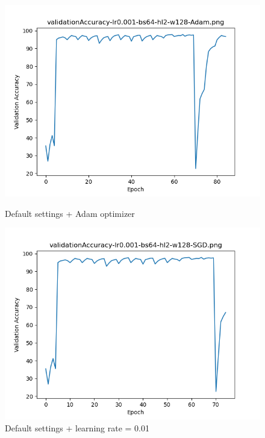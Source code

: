 \documentclass{article}[12pt]
\begin{document}
    \begin{figure}[H]
        \includegraphics[width=\linewidth]{testsResults/validationAccuracy/def.png}
        \caption{Default settings + Adam optimizer}
        \endminipage\hfill
        \includegraphics[width=\linewidth]{testsResults/validationAccuracy/validationAccuracy-lr0.001-bs64-hl2-w128-SGD.png}
        \caption{Default settings + learning rate = 0.01}
        \endminipage
    \end{figure}
\end{document}

